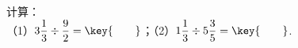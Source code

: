 计算：\\
（1）$3\dfrac{1}{3}\div\dfrac{9}{2}=\key{\qquad}$；\hspace{3cm}（2）$1\dfrac{1}{3}\div5\dfrac{3}{5}=\key{\qquad}$.
